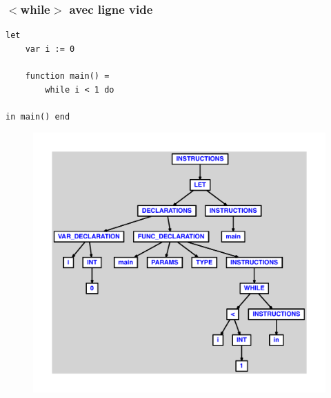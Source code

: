 \documentclass{article}
\begin{document}
\subsubsection{$ < $while$ > $ avec ligne vide}
\begin{lstlisting}
let
	var i := 0

	function main() =
		while i < 1 do

in main() end
\end{lstlisting}
\newpage
\begin{figure}[H]
\centering
\includegraphics[max width=\textwidth]{ast/ast_334.pdf}
\end{figure}
\newpage
\end{document}
